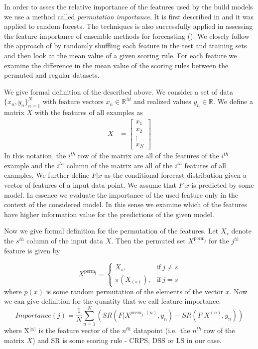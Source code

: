\documentclass[12pt,a4paper,twoside]{scrartcl}
\numberwithin{equation}{section}
\begin{document}
In order to asses the relative importance of the features used by the build models we use a method called \emph{permutation importance}. It is first described in  \cite{breiman2001} and it was applied to random forests. The techniques is also successfully applied in assessing the feature importance of ensemble methods for forecasting (\cite{lerch2018}). We closely follow the approach of \cite{lerch2018} by randomly shuffling each feature in the test and training sets and then look at the mean value of a given scoring rule. For each feature we examine the difference in the mean value of the scoring rules between the permuted and regular datasets.

We give formal definition of the described above. We consider a set of data \(\{x_n, y_n\}_{n=1}^N\) with feature vectors \(x_n\in\mathbb{R}^M\) and realized values \(y_n\in\mathbb{R}\). We define a matrix \(X\) with the features of all examples as
\begin{align}
  X &= \begin{bmatrix}
    x_{1} \\
    x_{2} \\
    \vdots \\
    x_{N}
  \end{bmatrix}
\end{align}
In this notation, the \(i^{th}\) row of the matrix are all of the features of the \(i^{th}\) example and the \(i^{th}\) column of the matrix are all of the \(i^{th}\) features of all examples. We further define \(F|x\) as the conditional forecast distribution given a vector of features of a input data point. We assume that \(F|x\) is predicted by some model. In essence we evaluate the importance of the used feature only in the context of the considered model. In this sense we examine which of the features have higher information value for the predictions of the given model.


Now we give formal definition for the permutation of the features. Let \(X_s\) denote the \(s^{th}\) column of the input data \(X\). Then the permuted set \(X^{\text{perm}_{\text{j}}}\) for the \(j^{th}\) feature is given by

\begin{equation}
  X^{\text{perm}_{\text{j}}} = 
  \begin{cases}
    X_{s},        & \text{if}\  j \neq s \\
    \pi(X_{(s)}), & \text{if}\  j = s
  \end{cases}
\end{equation}
where \(p(x)\) is some random permutation of the elements of the vector \(x\). Now we can give definition for the quantity that we call feature importance.
\begin{equation}
  \textit{Importance}(j) = \frac{1}{N}\sum_{n=1}^N (SR(F|X^{perm_j,(n)}, y_n) - SR(F|X^{(n)}, y_n) )
\end{equation}
where X\(^{\text{(n)}}\) is the feature vector of the \(n^{th}\) datapoint (i.e.\ the \(n^{th}\) row of the matrix \(X\)) and SR is some scoring rule - CRPS, DSS or LS in our case.
\end{document}
